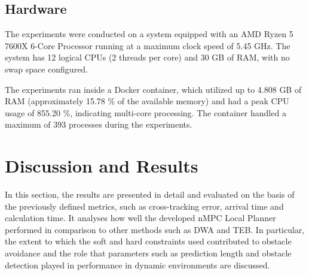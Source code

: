 \documentclass[conference]{IEEEtran}
\begin{document}




\subsection{Hardware}

The experiments were conducted on a system equipped with an AMD Ryzen 5 7600X 6-Core Processor running at a maximum clock speed of 5.45 GHz. The system has 12 logical CPUs (2 threads per core) and 30 GB of RAM, with no swap space configured.

The experiments ran inside a Docker container, which utilized up to 4.808 GB of RAM (approximately 15.78 \% of the available memory) and had a peak CPU usage of 855.20 \%, indicating multi-core processing. The container handled a maximum of 393 processes during the experiments.

\section{Discussion and Results}
In this section, the results are presented in detail and evaluated on the basis of the previously defined metrics, such as cross-tracking error, arrival time and calculation time. It analyses how well the developed nMPC Local Planner performed in comparison to other methods such as DWA and TEB. In particular, the extent to which the soft and hard constraints used contributed to obstacle avoidance and the role that parameters such as prediction length and obstacle detection played in performance in dynamic environments are discussed.
\end{document}
